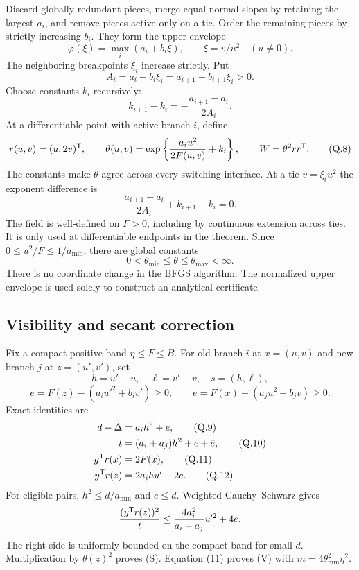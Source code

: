 Discard globally redundant pieces, merge equal normal slopes by retaining the largest $a_i$, and remove pieces active only on a tie. Order the remaining pieces by strictly increasing $b_i$. They form the upper envelope
\[
 \varphi(\xi)=\max_i(a_i+b_i\xi),\qquad \xi=v/u^2\quad(u\ne0).
\]
The neighboring breakpoints $\xi_i$ increase strictly. Put
\[
 A_i=a_i+b_i\xi_i=a_{i+1}+b_{i+1}\xi_i>0.
\]
Choose constants $k_i$ recursively:
\begin{equation}
 k_{i+1}-k_i=-\frac{a_{i+1}-a_i}{2A_i}. \tag{Q.7}
\end{equation}
At a differentiable point with active branch $i$, define
\begin{equation}
 r(u,v)=(u,2v)^{\mathsf T},\qquad
 \theta(u,v)=\exp\left\{\frac{a_i u^2}{2F(u,v)}+k_i\right\},
 \qquad W=\theta^2rr^{\mathsf T}. \tag{Q.8}
\end{equation}
The constants make $\theta$ agree across every switching interface. At a tie $v=\xi_i u^2$ the exponent difference is
\[
 \frac{a_{i+1}-a_i}{2A_i}+k_{i+1}-k_i=0.
\]
The field is well-defined on $F>0$, including by continuous extension across ties. It is only used at differentiable endpoints in the theorem. Since $0\le u^2/F\le1/a_{\min}$, there are global constants
\[
 0<\theta_{\min}\le\theta\le\theta_{\max}<\infty.
\]
There is no coordinate change in the BFGS algorithm. The normalized upper envelope is used solely to construct an analytical certificate.

\subsection{Visibility and secant correction}
Fix a compact positive band $\eta\le F\le B$. For old branch $i$ at $x=(u,v)$ and new branch $j$ at $z=(u',v')$, set
\[
 h=u'-u,\quad \ell=v'-v,\quad s=(h,\ell),
\]
\[
 e=F(z)-(a_i u'^2+b_i v')\ge0,\qquad
 \bar e=F(x)-(a_j u^2+b_jv)\ge0.
\]
Exact identities are
\begin{align}
 d-\Delta&=a_i h^2+e, \tag{Q.9}\\
 t&=(a_i+a_j)h^2+e+\bar e, \tag{Q.10}\\
 g^{\mathsf T} r(x)&=2F(x), \tag{Q.11}\\
 y^{\mathsf T} r(z)&=2a_i h u'+2e. \tag{Q.12}
\end{align}
For eligible pairs, $h^2\le d/a_{\min}$ and $e\le d$. Weighted Cauchy--Schwarz gives
\[
 \frac{(y^{\mathsf T} r(z))^2}{t}
 \le \frac{4a_i^2}{a_i+a_j}u'^2+4e.
\]
The right side is uniformly bounded on the compact band for small $d$. Multiplication by $\theta(z)^2$ proves (S). Equation (11) proves (V) with $m=4\theta_{\min}^2\eta^2$.

